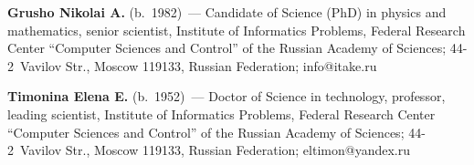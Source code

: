 \vspace*{3pt} 

\noindent
\textbf{Grusho Nikolai A.} (b.\ 1982)~--- Candidate of Science (PhD) in physics 
and mathematics, senior scientist, Institute of Informatics Problems, Federal 
Research Center ``Computer Sciences and Control'' of the Russian Academy of 
Sciences;  
44-2~Vavilov Str., Moscow 119133, Russian Federation; info@itake.ru 

\vspace*{3pt}

\noindent
\textbf{Timonina Elena E.} (b.\ 1952)~--- Doctor of Science in technology, 
professor, leading scientist, Institute of Informatics Problems, Federal Research 
Center ``Computer Sciences and Control'' of the Russian Academy of Sciences;  
44-2~Vavilov Str., Moscow 119133, Russian Federation; 
\mbox{eltimon@yandex.ru}
\label{end\stat}

\renewcommand{\bibname}{\protect\rm Литература}  